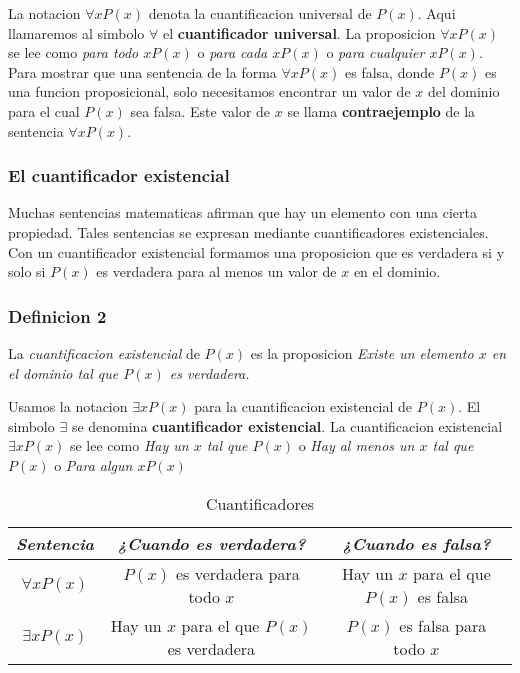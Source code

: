 \documentclass[]{article}
\begin{document}
La notacion $\forall x P(x)$ denota la cuantificacion universal de $P(x)$. Aqui llamaremos al simbolo $\forall$ el \textbf{cuantificador universal}. La proposicion $\forall x P(x)$ se lee como \textit{para todo $x P(x)$} o \textit{para cada $x P(x)$} o \textit{para cualquier $x P(x)$}.\\

Para mostrar que una sentencia de la forma $\forall x P(x)$ es falsa, donde $P(x)$ es una funcion proposicional, solo necesitamos encontrar un valor de $x$ del dominio para el cual $P(x)$ sea falsa. Este valor de $x$ se llama \textbf{contraejemplo} de la sentencia $\forall x P(x)$.

\subsubsection*{El cuantificador existencial}\label{sec:cuantificador-existencial}

Muchas sentencias matematicas afirman que hay un elemento con una cierta propiedad. Tales sentencias se expresan mediante cuantificadores existenciales. Con un cuantificador existencial formamos una proposicion que es verdadera si y solo si $P(x)$ es verdadera para al menos un valor de $x$ en el dominio.

\subsubsection*{Definicion 2}\label{sec:def2-cuantificacion}

La \textit{cuantificacion existencial} de $P(x)$ es la proposicion \textit{Existe un elemento $x$ en el dominio tal que $P(x)$ es verdadera.}

Usamos la notacion $\exists x P(x)$ para la cuantificacion existencial de $P(x)$. El simbolo $\exists$ se denomina \textbf{cuantificador existencial}. La cuantificacion existencial $\exists x P(x)$ se lee como \textit{Hay un $x$ tal que $P(x)$} o \textit{Hay al menos un $x$ tal que $P(x)$} o \textit{Para algun $x P(x)$}

\begin{table}[H]
	\caption*{Cuantificadores}
	\begin{center}
		\begin{tabular}{|c|c|c|}
			\hline
			\textit{Sentencia} & \textit{¿Cuando es verdadera?} & \textit{¿Cuando es falsa?}\\
			\hline
			$\forall x P(x)$ & $P(x)$ es verdadera para todo $x$ & Hay un $x$ para el que $P(x)$ es falsa\\
			\hline
			$\exists x P(x)$ & Hay un $x$ para el que $P(x)$ es verdadera & $P(x)$ es falsa para todo $x$\\
			\hline
		\end{tabular}
	\end{center}
\end{table}
\end{document}
